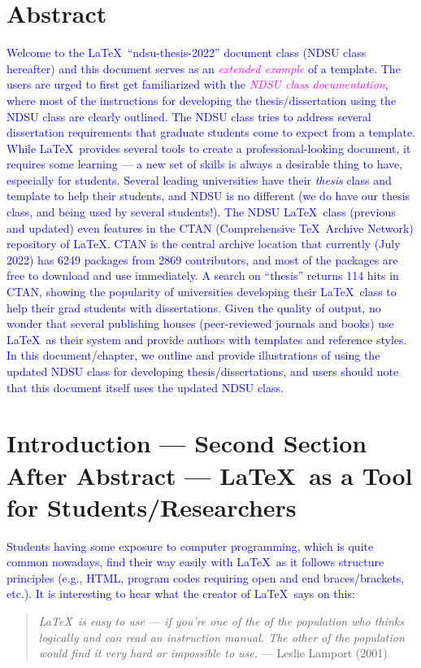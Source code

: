 \documentclass[phd,showframe]{ndsu-thesis-2022}
\newcommand\italk[1]{\textcolor{blue}{#1}}  %
\begin{document}
\section{Abstract}
\italk{Welcome to the \LaTeX\ ``ndsu-thesis-2022'' document class (NDSU class hereafter) and this document serves as an \textcolor{magenta}{\emph{extended example}} of a template. The users are urged to first get familiarized with the \textcolor{magenta}{\emph{NDSU class documentation}}, where most of the instructions for developing the thesis/dissertation using the NDSU class are clearly outlined. The NDSU class tries to address several dissertation requirements that graduate students come to expect from a template. While \LaTeX\ provides several tools to create a professional-looking document, it requires some learning --- a new set of skills is always a desirable thing to have, especially for students. Several leading universities have their \emph{thesis} class and template to help their students, and NDSU is no different (we do have our thesis class, and being used by several students!). The NDSU \LaTeX\ class (previous and updated) even features in the CTAN (Comprehensive \TeX\ Archive Network) repository of \LaTeX. CTAN is the central archive location that currently (July 2022) has 6249 packages from 2869 contributors, and most of the packages are free to download and use immediately. A search on ``thesis'' returns 114 hits in CTAN, showing the popularity of universities developing their \LaTeX\ class to help their grad students with dissertations. Given the quality of output, no wonder that several publishing houses (peer-reviewed journals and books) use \LaTeX\ as their system and provide authors with templates and reference styles. In this document/chapter, we outline and provide illustrations of using the updated NDSU class for developing thesis/dissertations, and users should note that this document itself uses the updated NDSU class.\\ 
}

\vspace{-5ex}
\section{Introduction --- Second Section After Abstract --- \LaTeX\ as a Tool for Students/Researchers}
\italk{Students having some exposure to computer programming, which is quite common nowadays, find their way easily with \LaTeX\ as it follows structure principles (e.g., HTML, program codes requiring open and end braces/brackets, etc.). It is interesting to hear what the creator of \LaTeX\ says on this:} 
\textcolor{magenta}{
\begin{quote}
\singlespacing
\raggedright
\textit{
\LaTeX\ is easy to use --- if you're one of the  of the population who thinks logically and can read an instruction manual. The other  of the population would find it very hard or impossible to use.} 
\hfill --- Leslie Lamport (2001)
\end{quote}
}
\end{document}
